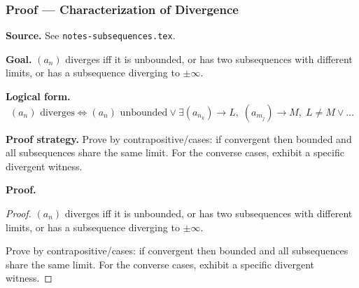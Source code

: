 

\clearpage
{}
\hypertarget{proof-RA-ABB-T-char-divergence}{}

\subsubsection[Characterization of Divergence]{Proof --- Characterization of Divergence}

\bigskip

\noindent
\textbf{Source.}
See \texttt{notes-subsequences.tex}.

\vspace{0.75em}

\noindent
\textbf{Goal.}
$(a_n)$ diverges iff it is unbounded, or has two subsequences with different limits, or has a subsequence diverging to $\pm\infty$.

\vspace{0.75em}

\noindent
\textbf{Logical form.}
\[
  (a_n) \text{ diverges} \Longleftrightarrow (a_n) \text{ unbounded} \vee \exists (a_{n_k}) \to L,\; (a_{m_j}) \to M,\; L \ne M \vee \ldots
\]

\vspace{0.75em}

\noindent
\textbf{Proof strategy.}
Prove by contrapositive/cases: if convergent then bounded and all subsequences share the same limit. For the converse cases, exhibit a specific divergent witness.

\vspace{0.75em}

\noindent
\textbf{Proof.}
\begin{proof}
\Claim $(a_n)$ diverges iff it is unbounded, or has two subsequences with different limits, or has a subsequence diverging to $\pm\infty$.

\Given 

\Goal 

\Strategy Prove by contrapositive/cases: if convergent then bounded and all subsequences share the same limit. For the converse cases, exhibit a specific divergent witness.

\medskip


\end{proof}

